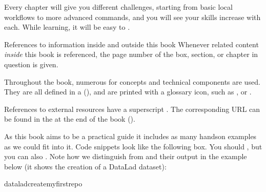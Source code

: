 \sphinxAtStartPar
Every chapter will give you different challenges, starting from basic local
workflows to more advanced commands, and you will see your skills increase
with each. While learning, it will be easy to
.

\begin{importantnote}[before title={\thetcbcounter\ }, check odd page=true]{References to information inside and outside this book}
\sphinxAtStartPar
Whenever related content \textit{inside} this book is referenced, the page number of the box, section, or chapter in question is given.

Throughout the book, numerous  for concepts and technical components
are used. They are all defined in a {\hyperref[\detokenize{glossary:glossary}]{}} (), and are printed
with a glossary icon, such as {\hyperref[\detokenize{glossary:term-Git}]{}}, or {\hyperref[\detokenize{glossary:term-commit-message}]{}}.

References to external resources have a superscript .
The corresponding URL can be found in the {\hyperref[\detokenize{appendix:hyperlink-url-index}]{}} at the end of the book
().
\end{importantnote}

\sphinxAtStartPar
As this book aims to be a practical guide it includes as many hands\sphinxhyphen{}on examples
as we could fit into it. Code snippets look like the following box. You should
, but you can also
.
Note how we distinguish  from  and their output
in the example below (it shows the creation of a DataLad dataset):

\begin{sphinxVerbatim}[commandchars=\\\{\}]
dataladcreatemyfirstrepo
\end{sphinxVerbatim}

